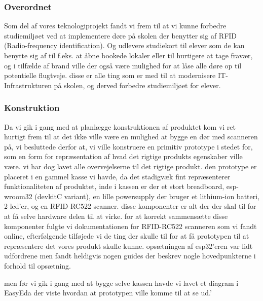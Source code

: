     \subsubsection{Overordnet}
    Som del af vores teknologiprojekt fandt vi frem til at vi kunne forbedre studiemiljøet ved at implementere døre på skolen der benytter sig af RFID (Radio-frequency identification). 
    Og udlevere studiekort til elever som de kan benytte sig af til f.eks. at åbne bookede lokaler eller til hurtigere at tage fravær,
    og i tilfælde af brand ville der også være mulighed for at låse alle døre op til potentielle flugtveje. disse er alle ting som er med til at modernisere IT-Infrastrukturen på skolen, 
    og derved forbedre studiemiljøet for elever.

    \subsubsection{Konstruktion}
    Da vi gik i gang med at planlægge konstruktionen af produktet kom vi ret hurtigt frem til at det ikke ville være en mulighed at bygge en dør med scanneren på, vi besluttede derfor at,
    vi ville konstruere en primitiv prototype i stedet for, som en form for repræsentation af hvad det rigtige produkts egenskaber ville være. vi har dog lavet alle overvejelserne til det rigtige produkt.
    den prototype er placeret i en gammel kasse vi havde, da det stadigvæk fint repræsenterer funktionaliteten af produktet, inde i kassen er der et stort breadboard, esp-wroom32 (devkitC variant),
    en lille powersupply der bruger et lithium-ion batteri, 2 led'er, og en RFID-RC522 scanner. disse komponenter er alt der der skal til for at få selve hardware delen til at virke. 
    for at korrekt sammensætte disse komponenter fulgte vi dokumentationen for RFID-RC522 scanneren som vi fandt online, efterfølgende tilføjede vi de ting der skulle til for at få prototypen til at repræsentere
    det vores produkt skulle kunne. opsætningen af esp32'eren var lidt udfordrene men fandt heldigvis nogen guides der beskrev nogle hovedpunkterne i forhold til opsætning.
    
    men før vi gik i gang med at bygge selve kassen havde vi lavet et diagram i EasyEda der viste hvordan at prototypen ville komme til at se ud.'
    
